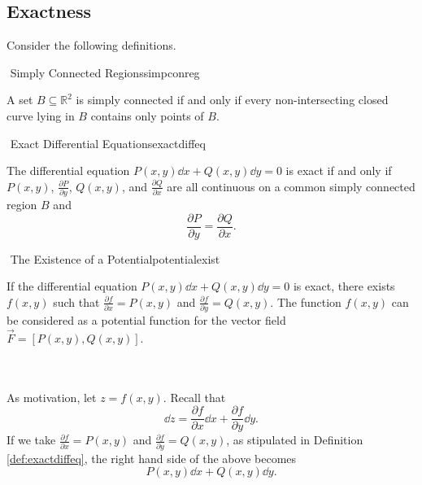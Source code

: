    \pagebreak

    \subsection{Exactness}

        Consider the following definitions.
        \begin{definition}{\Stop\,\,Simply Connected Regions}{simpconreg}

            A set \(B\subseteq\mathbb{R}^2\) is simply connected if and only if every non-intersecting closed curve lying in \(B\) contains only points of \(B\).
            
        \end{definition}
        \begin{definition}{\Stop\,\,Exact Differential Equations}{exactdiffeq}

            The differential equation \(P(x,y)\dd x+Q(x,y)\dd y=0\) is exact if and only if \(P(x,y)\), \(\frac{\partial P}{\partial y}\), \(Q(x,y)\), and \(\frac{\partial Q}{\partial x}\) are all continuous on a common simply connected region \(B\) and
            \begin{equation*}
                \frac{\partial P}{\partial y}=\frac{\partial Q}{\partial x}.
            \end{equation*}
        \end{definition}
        \begin{theorem}{\Stop\,\,The Existence of a Potential}{potentialexist}

            If the differential equation \(P(x,y)\dd x+Q(x,y)\dd y=0\) is exact, there exists \(f(x,y)\) such that \(\frac{\partial f}{\partial x}=P(x,y)\) and \(\frac{\partial f}{\partial y}=Q(x,y)\). The function \(f(x,y)\) can be considered as a potential function for the vector field \(\vec{F}=[P(x,y),Q(x,y)]\).
            
        \end{theorem}
        \vphantom
        \\
        \\
        As motivation, let \(z=f(x,y)\). Recall that
        \begin{equation*}
            \dd z=\frac{\partial f}{\partial x}\dd x+\frac{\partial f}{\partial y}\dd y.
        \end{equation*}
        If we take \(\frac{\partial f}{\partial x}=P(x,y)\) and \(\frac{\partial f}{\partial y}=Q(x,y)\), as stipulated in Definition \ref{def:exactdiffeq}, the right hand side of the above becomes
        \begin{equation*}
            P(x,y)\dd x+Q(x,y)\dd y.
        \end{equation*}

